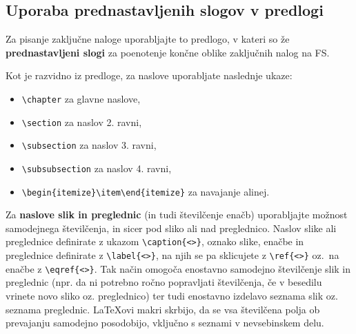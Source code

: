 \subsection{Uporaba prednastavljenih slogov v predlogi}\label{sec:prednastavitve}
Za pisanje zaključne naloge uporabljajte to predlogo, v kateri so že \textbf{prednastavljeni slogi} za poenotenje končne oblike zaključnih nalog na FS.

Kot je razvidno iz predloge, za naslove uporabljate naslednje ukaze:
\begin{itemize}
\item \verb|\chapter| za glavne naslove,
\item \verb|\section| za naslov 2. ravni,
\item \verb|\subsection| za naslov 3. ravni,
\item \verb|\subsubsection| za naslov 4. ravni,
\item \verb|\begin{itemize}\item\end{itemize}| za navajanje alinej.
\end{itemize}

Za \textbf{naslove slik in preglednic} (in tudi številčenje enačb) uporabljajte možnost samodejnega številčenja, in sicer pod sliko ali nad preglednico. Naslov slike ali preglednice definirate z ukazom \verb|\caption{<>}|, oznako slike, enačbe in preglednice definirate z \verb|\label{<>}|, na njih se pa sklicujete z \verb|\ref{<>}| oz.~na enačbe z \verb|\eqref{<>}|. Tak način omogoča enostavno samodejno številčenje slik in preglednic (npr. da ni potrebno ročno popravljati številčenja, če v besedilu vrinete novo sliko oz. preglednico) ter tudi enostavno izdelavo seznama slik oz. seznama preglednic. \LaTeX ovi makri skrbijo, da se vsa številčena polja ob prevajanju samodejno posodobijo, vključno s seznami v nevsebinskem delu.


